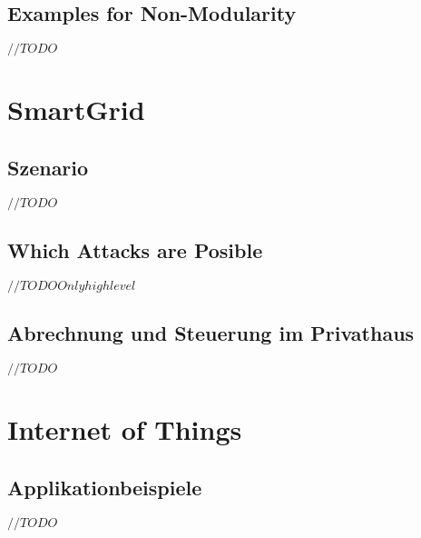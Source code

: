 \documentclass[a4paper, 12pt]{article}
\begin{document}
\subsection{Examples for Non-Modularity}
$ //TODO $

\section{SmartGrid}
\subsection{Szenario}
$ //TODO $
\subsection{Which Attacks are Posible}
$ //TODO Only highlevel$
\subsection{Abrechnung und Steuerung im Privathaus}
$ //TODO $

\section{Internet of Things}
\subsection{Applikationbeispiele}
$ //TODO $
\end{document}
